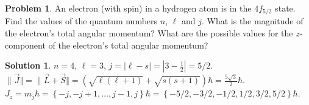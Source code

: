\documentclass[10pt]{article}
\theoremstyle{definition}
\newtheorem{problem}{Problem}
\newtheorem{soln}{Solution}
\begin{document}
\begin{problem}
An electron (with spin) in a hydrogen atom is in the $4f_{5/2}$ state. Find the values of the quantum numbers
$n$, $\ell$ and $j$. What is the magnitude of the electron's total angular momentum? What are the possible values
for the $z$-component of the electron's total angular momentum?
\end{problem}
\begin{soln}
  $n=4$, $\ell=3$, $j=\left|\ell-s\right|=\left|3-\frac{1}{2}\right|=5/2$.
  $\| \vec{J}\Vert =\| \vec{L}+ \vec{S}\Vert=\left(\sqrt{\ell(\ell+1)}+\sqrt{s(s+1)}\right)\hbar=\frac{5\sqrt{3}}{2}\hbar$.
  $J_z=m_j\hbar=\left\{-j,-j+1,\dots, j-1, j\right\}\hbar=\left\{-5/2,-3/2,-1/2, 1/2, 3/2, 5/2\right\}\hbar$.
\end{soln}
\newpage
\end{document}
